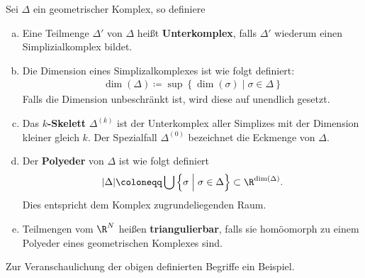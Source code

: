\begin{Def}
  Sei $\Delta$ ein geometrischer Komplex, so definiere
  \begin{enumerate}[(a)]
  \item Eine Teilmenge $\Delta'$ von $\Delta$ heißt
    \textbf{Unterkomplex}, falls $\Delta'$ wiederum einen
    Simplizialkomplex bildet.
  \item Die Dimension eines Simplizalkomplexes ist wie folgt
    definiert:
    \begin{gather*}
      \dim(\Delta) \coloneqq \sup \left\{ \dim(\sigma) \; \Big| \;
        \sigma \in \Delta \right\}
    \end{gather*}
    Falls die Dimension unbeschränkt ist, wird diese auf unendlich
    gesetzt.
  \item Das \textbf{$k$-Skelett} $\Delta^{(k)}$ ist der Unterkomplex
    aller Simplizes mit der Dimension kleiner gleich $k$. Der
    Spezialfall $\Delta^{(0)}$ bezeichnet die Eckmenge von $\Delta$.
  \item Der \textbf{Polyeder} von $\Delta$ ist wie folgt definiert
    \begin{gather*}
      |\Delta| \coloneqq \bigcup \left\{ \sigma \; \Big| \; \sigma \in
        \Delta \right\} \subset \R^{\dim(\Delta)}.
    \end{gather*}
    Dies entspricht dem Komplex zugrundeliegenden Raum.
  \item Teilmengen vom $\R^N$ heißen \textbf{triangulierbar}, falls
    sie homöomorph zu einem Polyeder eines geometrischen Komplexes sind.
  \end{enumerate}
\end{Def}

Zur Veranschaulichung der obigen definierten Begriffe ein Beispiel.

